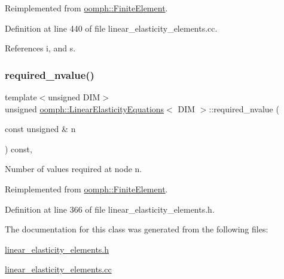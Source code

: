 Reimplemented from \hyperlink{classoomph_1_1FiniteElement_a2a8426dccd57b927be0ae0eec00d0479}{oomph\+::\+Finite\+Element}.



Definition at line 440 of file linear\+\_\+elasticity\+\_\+elements.\+cc.



References i, and s.

\mbox{\label{classoomph_1_1LinearElasticityEquations_a1a7c0ad418431d47239c933fbdeb0c4b}} 
\subsubsection{\texorpdfstring{required\+\_\+nvalue()}{required\_nvalue()}}
{\footnotesize\ttfamily template$<$unsigned D\+IM$>$ \\
unsigned \hyperlink{classoomph_1_1LinearElasticityEquations}{oomph\+::\+Linear\+Elasticity\+Equations}$<$ D\+IM $>$\+::required\+\_\+nvalue (\begin{DoxyParamCaption}\item[{const unsigned \&}]{n }\end{DoxyParamCaption}) const\hspace{0.3cm}{\ttfamily [inline]}, {\ttfamily [virtual]}}



Number of values required at node n. 



Reimplemented from \hyperlink{classoomph_1_1FiniteElement_a56610c60d5bc2d7c27407a1455471b1a}{oomph\+::\+Finite\+Element}.



Definition at line 366 of file linear\+\_\+elasticity\+\_\+elements.\+h.



The documentation for this class was generated from the following files\+:\begin{DoxyCompactItemize}
\item 
\hyperlink{linear__elasticity__elements_8h}{linear\+\_\+elasticity\+\_\+elements.\+h}\item 
\hyperlink{linear__elasticity__elements_8cc}{linear\+\_\+elasticity\+\_\+elements.\+cc}\end{DoxyCompactItemize}
